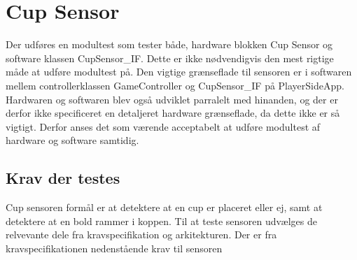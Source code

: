 \documentclass[Modultest/Modultest_main.tex]{subfiles}
\begin{document}
\section{Cup Sensor} \label{sec:CupSensor}
Der udføres en modultest som tester både, hardware blokken Cup Sensor og software klassen CupSensor\_IF. Dette er ikke nødvendigvis den mest rigtige måde at udføre modultest på. Den vigtige grænseflade til sensoren er i softwaren mellem controllerklassen GameController og CupSensor\_IF på PlayerSideApp. Hardwaren og softwaren blev også udviklet parralelt med hinanden, og der er derfor ikke specificeret en detaljeret hardware grænseflade, da dette ikke er så vigtigt. Derfor anses det som værende acceptabelt at udføre modultest af hardware og software samtidig.

\subsection{Krav der testes}
Cup sensoren formål er at detektere at en cup er placeret eller ej, samt at detektere at en bold rammer i koppen. Til at teste sensoren udvælges de relvevante dele fra kravspecifikation og arkitekturen. Der er fra kravspecifikationen nedenstående krav til sensoren
\end{document}
